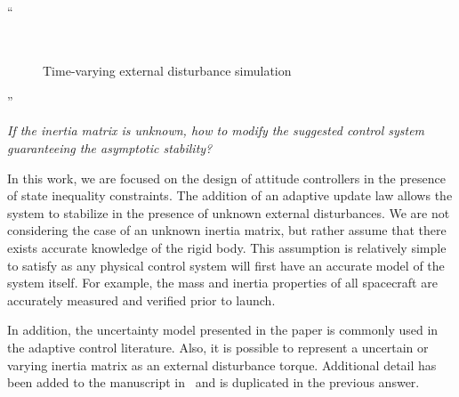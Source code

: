 \documentclass[11pt]{article}
\newenvironment{correction}{\begin{list}{}{\setlength{\leftmargin}{1cm}\setlength{\rightmargin}{1cm}}\vspace{\parsep}\item[]``}{''\end{list}}
\begin{document}
\begin{enumerate}
\begin{correction}
    \begin{figure}
        \centering 
        ~
        ~
        \caption{Time-varying external disturbance simulation}
         
    \end{figure}

\end{correction}
\item \textit{If the inertia matrix is unknown, how to modify the suggested control system guaranteeing the asymptotic stability?}

In this work, we are focused on the design of attitude controllers in the presence of state inequality constraints. 
The addition of an adaptive update law allows the system to stabilize in the presence of unknown external disturbances.
We are not considering the case of an unknown inertia matrix, but rather assume that there exists accurate knowledge of the rigid body. 
This assumption is relatively simple to satisfy as any physical control system will first have an accurate model of the system itself.
For example, the mass and inertia properties of all spacecraft are accurately measured and verified prior to launch. 

In addition, the uncertainty model presented in the paper is commonly used in the adaptive control literature.
Also, it is possible to represent a uncertain or varying inertia matrix as an external disturbance torque. 
Additional detail has been added to the manuscript in~ and is duplicated in the previous answer.


\end{enumerate}
\end{document}

